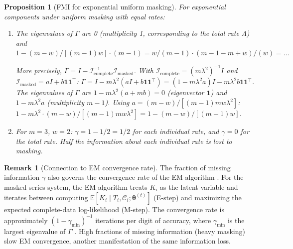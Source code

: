 \documentclass[11pt]{article}
\theoremstyle{definition}
\newtheorem{remark}{Remark}
\theoremstyle{plain}
\newtheorem{proposition}{Proposition}
\renewcommand{\v}[1]{\boldsymbol{#1}}
\newcommand{\btheta}{\v{\theta}}
\newcommand{\E}{\mathbb{E}}
\newcommand{\FI}{\mathcal{I}}       %
\begin{document}
\begin{proposition}[FMI for exponential uniform masking]
\label{prop:fmi-expo}
For exponential components under uniform masking with equal rates:
\begin{enumerate}[label=(\alph*)]
    \item The eigenvalues of $\Gamma$ are 0 (multiplicity 1,
    corresponding to the total rate $\Lambda$) and
    $1 - (m-w)/[(m-1)w] \cdot (m-1) = w/(m-1) \cdot (m-1-m+w)/(w) = \ldots$

    More precisely, $\Gamma = I - \FI_{\mathrm{complete}}^{-1}
    \FI_{\mathrm{masked}}$.
    With $\FI_{\mathrm{complete}} = (m\lambda^2)^{-1} I$ and
    $\FI_{\mathrm{masked}} = aI + b\v{1}\v{1}^\top$:
    $\Gamma = I - m\lambda^2 (aI + b\v{1}\v{1}^\top)
    = (1 - m\lambda^2 a)I - m\lambda^2 b \v{1}\v{1}^\top$.
    The eigenvalues of $\Gamma$ are $1 - m\lambda^2(a + mb) = 0$
    (eigenvector $\v{1}$) and $1 - m\lambda^2 a$
    (multiplicity $m - 1$).
    Using $a = (m-w)/[(m-1)mw\lambda^2]$:
    $1 - m\lambda^2 \cdot (m-w)/[(m-1)mw\lambda^2]
    = 1 - (m-w)/[(m-1)w]$.

    \item For $m = 3$, $w = 2$:
    $\gamma = 1 - 1/2 = 1/2$ for each individual rate, and
    $\gamma = 0$ for the total rate.
    Half the information about each individual rate is lost to masking.
\end{enumerate}
\end{proposition}

\begin{remark}[Connection to EM convergence rate]
\label{rem:em-convergence}
The fraction of missing information $\gamma$ also governs the
convergence rate of the EM algorithm \citep{dempster1977}.
For the masked series system, the EM algorithm treats $K_i$ as the
latent variable and iterates between computing
$\E[K_i \mid T_i, \mathcal{C}_i; \btheta^{(t)}]$ (E-step) and
maximizing the expected complete-data log-likelihood (M-step).
The convergence rate is approximately
$(1 - \gamma_{\min})^{-1}$ iterations per digit of accuracy, where
$\gamma_{\min}$ is the largest eigenvalue of $\Gamma$
\citep{dempster1977}.
High fractions of missing information (heavy masking) slow EM
convergence, another manifestation of the same information loss.
\end{remark}



\end{document}
